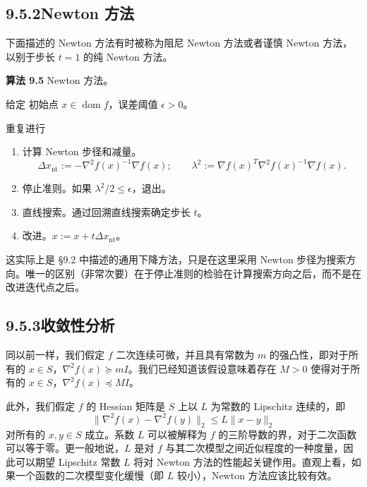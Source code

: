 \documentclass[UTF8, 12pt, fontset=fandol, oneside]{ctexart}
\begin{document}
\subsection*{9.5.2\quad Newton 方法}

下面描述的 Newton 方法有时被称为阻尼 Newton 方法或者谨慎 Newton 方法，以别于步长 $t=1$ 的纯 Newton 方法。

\noindent\textbf{算法 9.5}\quad
Newton 方法。

给定 初始点 $x\in\operatorname{dom} f$，误差阈值 $\epsilon>0$。

重复进行
\begin{enumerate}
\item 计算 Newton 步径和减量。
\[
\Delta x_{\mathrm{nt}}:=-\nabla^2f(x)^{-1}\nabla f(x);\qquad
\lambda^2:=\nabla f(x)^T\nabla^2f(x)^{-1}\nabla f(x).
\]
\item 停止准则。如果 $\lambda^2/2\leq\epsilon$，退出。
\item 直线搜索。通过回溯直线搜索确定步长 $t$。
\item 改进。$x:=x+t\Delta x_{\mathrm{nt}}$。
\end{enumerate}

这实际上是 \S9.2 中描述的通用下降方法，只是在这里采用 Newton 步径为搜索方向。唯一的区别（非常次要）在于停止准则的检验在计算搜索方向之后，而不是在改进迭代点之后。

\subsection*{9.5.3\quad 收敛性分析}

同以前一样，我们假定 $f$ 二次连续可微，并且具有常数为 $m$ 的强凸性，即对于所有的 $x\in S$，$\nabla^2f(x)\succeq mI$。我们已经知道该假设意味着存在 $M>0$ 使得对于所有的 $x\in S$，$\nabla^2f(x)\preceq MI$。

此外，我们假定 $f$ 的 Hessian 矩阵是 $S$ 上以 $L$ 为常数的 Lipschitz 连续的，即
\begin{equation}
\|\nabla^2f(x)-\nabla^2f(y)\|_2\leq L\|x-y\|_2
\tag{9.31}
\end{equation}
对所有的 $x,y\in S$ 成立。系数 $L$ 可以被解释为 $f$ 的三阶导数的界，对于二次函数可以等于零。更一般地说，$L$ 是对 $f$ 与其二次模型之间近似程度的一种度量，因此可以期望 Lipschitz 常数 $L$ 将对 Newton 方法的性能起关键作用。直观上看，如果一个函数的二次模型变化缓慢（即 $L$ 较小），Newton 方法应该比较有效。
\end{document}
